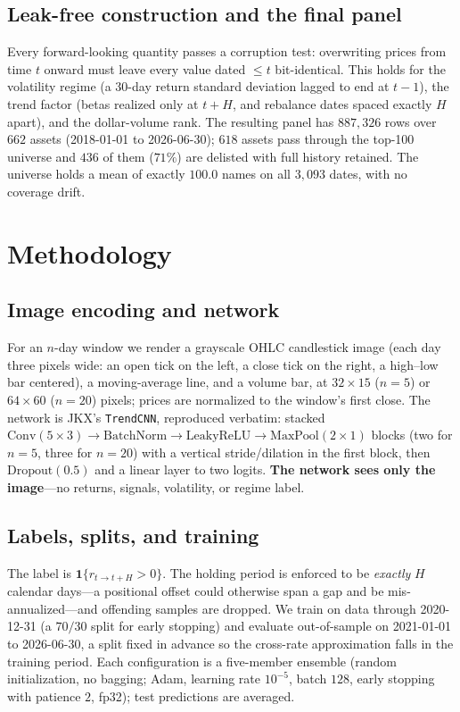 \documentclass[11pt]{article}
\begin{document}
\subsection{Leak-free construction and the final panel}
Every forward-looking quantity passes a corruption test: overwriting prices from time $t$ onward
must leave every value dated $\le t$ bit-identical. This holds for the volatility regime (a
30-day return standard deviation lagged to end at $t-1$), the \citet{han2016trend} trend factor
(betas realized only at $t+H$, and rebalance dates spaced exactly $H$ apart), and the dollar-volume
rank. The resulting panel has $887{,}326$ rows over $662$ assets (2018-01-01 to 2026-06-30);
$618$ assets pass through the top-100 universe and $436$ of them ($71\%$) are delisted with full
history retained. The universe holds a mean of exactly $100.0$ names on all $3{,}093$ dates, with no
coverage drift.

\section{Methodology}

\subsection{Image encoding and network}
For an $n$-day window we render a grayscale OHLC candlestick image (each day three pixels wide: an
open tick on the left, a close tick on the right, a high--low bar centered), a moving-average line,
and a volume bar, at $32\times15$ ($n{=}5$) or $64\times60$ ($n{=}20$) pixels; prices are normalized
to the window's first close. The network is JKX's \texttt{TrendCNN}, reproduced verbatim: stacked
$\text{Conv}(5\times3)\to\text{BatchNorm}\to\text{LeakyReLU}\to\text{MaxPool}(2\times1)$ blocks (two
for $n{=}5$, three for $n{=}20$) with a vertical stride/dilation in the first block, then
$\text{Dropout}(0.5)$ and a linear layer to two logits. \textbf{The network sees only the image}---no
returns, signals, volatility, or regime label.

\subsection{Labels, splits, and training}
The label is $\mathbf{1}\{r_{t\to t+H}>0\}$. The holding period is enforced to be \emph{exactly} $H$
calendar days---a positional offset could otherwise span a gap and be mis-annualized---and offending
samples are dropped. We train on data through 2020-12-31 (a $70/30$ split for early stopping) and
evaluate out-of-sample on 2021-01-01 to 2026-06-30, a split fixed in advance so the cross-rate
approximation falls in the training period. Each configuration is a five-member ensemble (random
initialization, no bagging; Adam, learning rate $10^{-5}$, batch $128$, early stopping with patience
$2$, fp32); test predictions are averaged.
\end{document}
